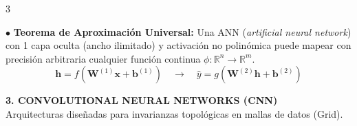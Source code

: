 \documentclass[8pt,a4paper,landscape,fleqn]{extarticle}
\begin{document}
\begin{multicols*}{3}
\begin{center}
\begin{tikzpicture}[x=1.75cm, y=0.65cm, >=stealth]
\end{tikzpicture}
\end{center}





$\bullet$ \textbf{Teorema de Aproximación Universal:} Una ANN (\textit{artificial neural network}) con 1 capa oculta (ancho ilimitado) y activación no polinómica puede mapear con precisión arbitraria cualquier función continua $\phi: \mathbb{R}^n \to \mathbb{R}^m$.
$$ \bm{h} = f(\bm{W}^{(1)}\bm{x} + \bm{b}^{(1)}) \quad \to \quad \hat{y} = g(\bm{W}^{(2)}\bm{h} + \bm{b}^{(2)}) $$

\textbf{3. CONVOLUTIONAL NEURAL NETWORKS (CNN)}\\
Arquitecturas diseñadas para invarianzas topológicas en mallas de datos (Grid).

\shorthandoff{<>} %
\begin{minipage}{9.9cm}
    \centering
    
\end{minipage}
\end{multicols*}
\end{document}
